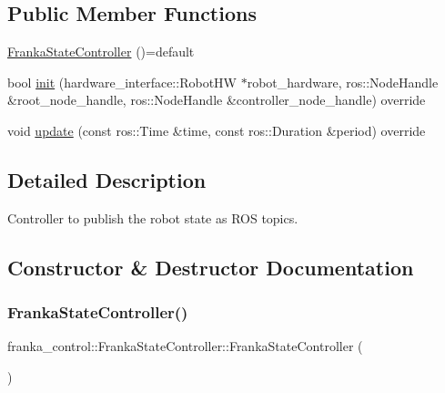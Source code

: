 \subsection*{Public Member Functions}
\begin{DoxyCompactItemize}
\item 
\hyperlink{classfranka__control_1_1_franka_state_controller_a6207d8555975e26ed6a3cfcbb40c7397}{Franka\+State\+Controller} ()=default
\item 
bool \hyperlink{classfranka__control_1_1_franka_state_controller_aa8929333f04012a8b1b9049a5264e157}{init} (hardware\+\_\+interface\+::\+Robot\+HW $\ast$robot\+\_\+hardware, ros\+::\+Node\+Handle \&root\+\_\+node\+\_\+handle, ros\+::\+Node\+Handle \&controller\+\_\+node\+\_\+handle) override
\item 
void \hyperlink{classfranka__control_1_1_franka_state_controller_ad7a282e355860395576ff4d116bbbb7b}{update} (const ros\+::\+Time \&time, const ros\+::\+Duration \&period) override
\end{DoxyCompactItemize}


\subsection{Detailed Description}
Controller to publish the robot state as R\+OS topics. 

\subsection{Constructor \& Destructor Documentation}
\mbox{\label{classfranka__control_1_1_franka_state_controller_a6207d8555975e26ed6a3cfcbb40c7397}} 
\subsubsection{\texorpdfstring{Franka\+State\+Controller()}{FrankaStateController()}}
{\footnotesize\ttfamily franka\+\_\+control\+::\+Franka\+State\+Controller\+::\+Franka\+State\+Controller (\begin{DoxyParamCaption}{ }\end{DoxyParamCaption})\hspace{0.3cm}{\ttfamily [default]}}

